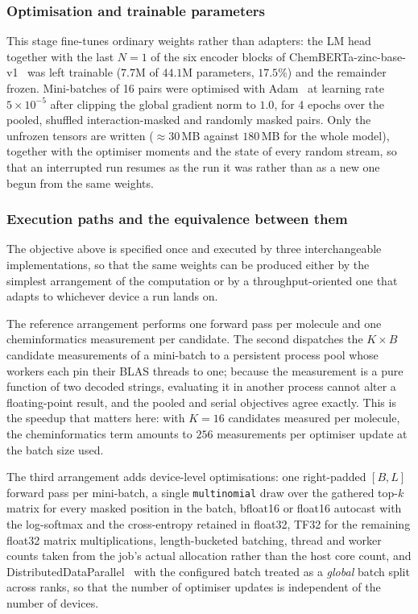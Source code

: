 \documentclass[a4paper,12pt]{article}
\begin{document}
\subsubsection{Optimisation and trainable parameters}

This stage fine-tunes ordinary weights rather than adapters: the LM head
together with the last $N=1$ of the six encoder blocks of
ChemBERTa-zinc-base-v1~\cite{chithrananda2020chemberta} was left trainable
($7.7$M of $44.1$M parameters, $17.5\%$) and the remainder frozen. Mini-batches
of 16 pairs were optimised with Adam~\cite{kingma2015adam} at learning rate
$5\times10^{-5}$ after clipping the global gradient norm to $1.0$, for 4 epochs
over the pooled, shuffled interaction-masked and randomly masked pairs. Only the
unfrozen tensors are written ($\approx\!30$\,MB against $180$\,MB for the whole
model), together with the optimiser moments and the state of every random
stream, so that an interrupted run resumes as the run it was rather than as a
new one begun from the same weights.

\subsubsection{Execution paths and the equivalence between them}

The objective above is specified once and executed by three interchangeable
implementations, so that the same weights can be produced either by the simplest
arrangement of the computation or by a throughput-oriented one that adapts to
whichever device a run lands on.

The reference arrangement performs one forward pass per molecule and one
cheminformatics measurement per candidate. The second dispatches the
$K\!\times\!B$ candidate measurements of a mini-batch to a persistent process
pool whose workers each pin their BLAS threads to one; because the measurement
is a pure function of two decoded strings, evaluating it in another process
cannot alter a floating-point result, and the pooled and serial objectives agree
exactly. This is the speedup that matters here: with $K=16$ candidates measured
per molecule, the cheminformatics term amounts to $256$ measurements per
optimiser update at the batch size used.

The third arrangement adds device-level optimisations: one right-padded $[B,L]$
forward pass per mini-batch, a single \texttt{multinomial} draw over the gathered
top-$k$ matrix for every masked position in the batch, bfloat16 or float16
autocast with the log-softmax and the cross-entropy retained in float32, TF32
for the remaining float32 matrix multiplications, length-bucketed batching,
thread and worker counts taken from the job's actual allocation rather than the
host core count, and DistributedDataParallel~\cite{li2020pytorchddp} with the
configured batch treated as a \emph{global} batch split across ranks, so that
the number of optimiser updates is independent of the number of devices.
\end{document}
